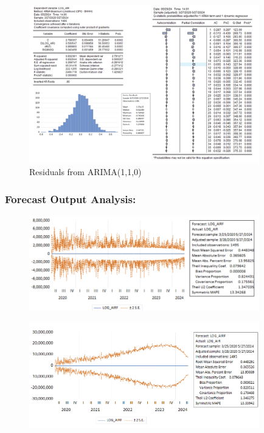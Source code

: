 \documentclass{article} %
\begin{document}
\begin{figure}[H]
    \centering
    \includegraphics[width=10cm]{images/image40.png}
    \caption{Residuals from ARIMA(1,1,0)}
\end{figure}

\subsubsection*{Forecast Output Analysis:}

\begin{figure}[H]
    \centering
    \includegraphics[width=10cm]{images/image41.png}
\end{figure}

\begin{figure}[H]
    \centering
    \includegraphics[width=10cm]{images/image26.png}
\end{figure}
\end{document}
